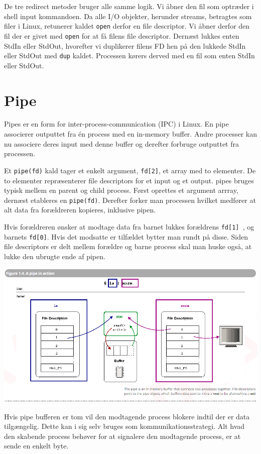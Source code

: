\documentclass[danish]{report}
\begin{document}
De tre redirect metoder bruger alle samme logik. Vi åbner den fil som optræder i shell input kommandoen. Da alle I/O objekter, herunder streams, betragtes som filer i Linux, retunerer kaldet {\tt open} derfor en file descriptor. Vi åbner derfor den fil der er givet med {\tt open} for at få filens file descriptor. Dernæst lukkes enten StdIn eller StdOut, hvorefter vi duplikerer filens FD hen på den lukkede StdIn eller StdOut med {\tt dup} kaldet. Processen kørers derved med en fil som enten StdIn eller StdOut. 

\section{Pipe}
\label{pipe}

Pipes er en form for inter-process-communication (IPC) i Linux. En pipe associerer outputtet fra én process med en in-memory buffer. Andre processer kan nu associere deres input med denne buffer og derefter forbruge outputtet fra processen. 

Et {\tt pipe(fd)} kald tager et enkelt argument, {\tt fd[2]}, et array med to elementer. De to elementer repræsenterer file descriptors for et input og et output. pipes bruges typisk mellem en parent og child process. Først oprettes et argument arrray, dernæst etableres en {\tt pipe(fd)}. Derefter forker man processen hvilket medfører at alt data fra forældreren kopieres, inklusive pipen. 

Hvis forældreren ønsker at modtage data fra barnet lukkes forældrens {\tt fd[1] }, og barnets {\tt fd[0]}. Hvis det modsatte er tilfældet bytter man  rundt på disse. Siden file descriptors er delt mellem forældre og barne process skal man huske også, at lukke den ubrugte ende af pipen.


\includegraphics[scale=0.5]{pipe}

Hvis pipe bufferen er tom vil den modtagende process blokere indtil der er data tilgængelig. Dette kan i sig selv bruges som kommunikationsstrategi. Alt hvad den skabende process behøver for at signalere den modtagende process, er at sende en enkelt byte.
\end{document}

